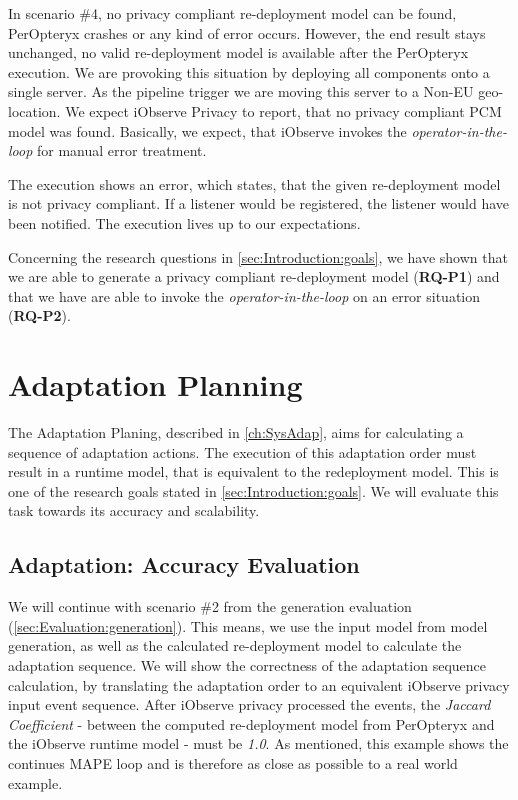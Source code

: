 In scenario \#4, no privacy compliant re-deployment model can be found, PerOpteryx crashes or any kind of error occurs. However, the end result stays unchanged, no valid re-deployment model is available after the PerOpteryx execution. We are provoking this situation by deploying all components onto a single server. As the pipeline trigger we are moving this server to a Non-EU geo-location. We expect iObserve Privacy to report, that no privacy compliant PCM model was found. Basically, we expect, that iObserve invokes the \textit{operator-in-the-loop} for manual error treatment.

The execution shows an error, which states, that the given re-deployment model is not privacy compliant. If a listener would be registered, the listener would have been notified. The execution lives up to our expectations.

Concerning the research questions in \autoref{sec:Introduction:goals}, we have shown that we are able to generate a privacy compliant re-deployment model (\textbf{RQ-P1}) and that we have are able to invoke the \textit{operator-in-the-loop} on an error situation (\textbf{RQ-P2}).

\section{Adaptation Planning}
\label{sec:Evaluation:planning}

The Adaptation Planing, described in \autoref{ch:SysAdap}, aims for calculating a sequence of adaptation actions. The execution of this adaptation order must result in a runtime model, that is equivalent to the redeployment model. This is one of the research goals stated in \autoref{sec:Introduction:goals}. We will evaluate this task towards its accuracy and scalability.

 
\subsection{Adaptation: Accuracy Evaluation}

We will continue with scenario \#2 from the generation evaluation (\autoref{sec:Evaluation:generation}). This means, we use the input model from model generation, as well as the calculated re-deployment model to calculate the adaptation sequence. We will show the correctness of the adaptation sequence calculation, by translating the adaptation order to an equivalent iObserve privacy input event sequence. After iObserve privacy processed the events, the \textit{Jaccard Coefficient} - between the computed re-deployment model from PerOpteryx and the iObserve runtime model - must be \textit{1.0}. As mentioned, this example shows the continues MAPE loop and is therefore as close as possible to a real world example.

